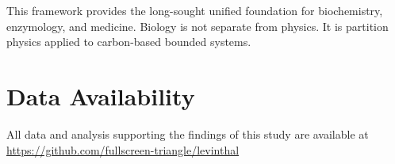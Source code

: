 \documentclass[twocolumn,10pt,a4paper]{article}
\theoremstyle{definition}
\theoremstyle{remark}
\begin{document}
This framework provides the long-sought unified foundation for biochemistry, enzymology, and medicine. Biology is not separate from physics. It is partition physics applied to carbon-based bounded systems.

\section*{Data Availability}

All data and analysis supporting the findings of this study are available at \url{https://github.com/fullscreen-triangle/levinthal}




\end{document}
